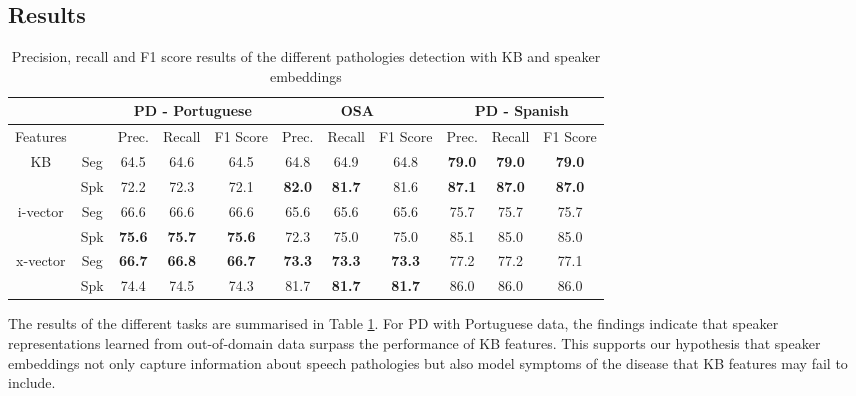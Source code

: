 \subsection{Results}
\begin{table}[h]
  \begin{tabular}{cc|ccc|ccc|ccc} \hline
                            &     & \multicolumn{3}{c|}{PD - Portuguese} & \multicolumn{3}{c|}{OSA}                      & \multicolumn{3}{c}{PD - Spanish} \\ \hline
  Features                  &     & Prec.        & Recall           & F1 Score        & Prec.     & Recall        & F1 Score      & Prec.       & Recall         & F1 Score       \\ \hline
  \multirow{2}{*}{KB}       & Seg & 64.5             & 64.6             & 64.5            & 64.8          & 64.9          & 64.8          & \textbf{79.0}   & \textbf{79.0}  & \textbf{79.0}  \\
                            & Spk & 72.2             & 72.3             & 72.1            & \textbf{82.0} & \textbf{81.7} & 81.6          & \textbf{87.1}   & \textbf{87.0}  & \textbf{87.0}  \\ \hline
  \multirow{2}{*}{i-vector} & Seg & 66.6             & 66.6             & 66.6            & 65.6          & 65.6          & 65.6          & 75.7            & 75.7           & 75.7           \\
                            & Spk & \textbf{75.6}    & \textbf{75.7}    & \textbf{75.6}   & 72.3          & 75.0          & 75.0          & 85.1            & 85.0           & 85.0           \\ \hline
  \multirow{2}{*}{x-vector} & Seg & \textbf{66.7}    & \textbf{66.8}    & \textbf{66.7}   & \textbf{73.3} & \textbf{73.3} & \textbf{73.3} & 77.2            & 77.2           & 77.1           \\
                            & Spk & 74.4             & 74.5             & 74.3            & 81.7          & \textbf{81.7} & \textbf{81.7} & 86.0            & 86.0           & 86.0 \\ \hline    
  \end{tabular}
  \caption{Precision, recall and F1 score results of the different pathologies detection with KB and speaker embeddings}
  \label{tab:xvect_results}
  \end{table}
The results of the different tasks are summarised in Table \ref{tab:xvect_results}. For \ac{PD} with Portuguese data, the findings indicate that speaker representations learned from out-of-domain data surpass the performance of \ac{KB} features. This supports our hypothesis that speaker embeddings not only capture information about speech pathologies but also model symptoms of the disease that \ac{KB} features may fail to include.

